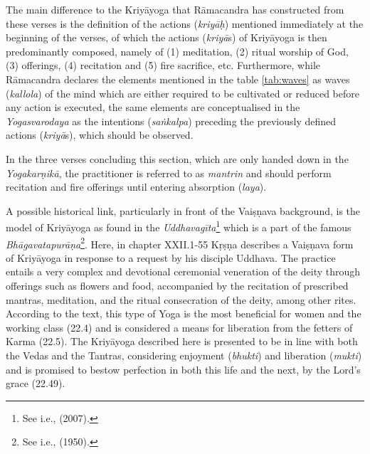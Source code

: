 The main difference to the Kriyāyoga that Rāmacandra has constructed from these verses is the definition of the actions (\textit{kriyāḥ}) mentioned immediately at the beginning of the verses, of which the actions (\textit{kriyā}s) of Kriyāyoga is then predominantly composed, namely of (1) meditation, (2) ritual worship of God, (3) offerings, (4) recitation and (5) fire sacrifice, etc. Furthermore, while Rāmacandra declares the elements mentioned in the table \ref{tab:waves} as waves (\textit{kallola}) of the mind which are either required to be cultivated or reduced before any action is executed, the same elements are conceptualised in the \textit{Yogasvarodaya} as the intentions (\textit{saṅkalpa}) preceding the previously defined actions (\textit{kriyā}s), which should be observed.

In the three verses concluding this section, which are only handed down in the \textit{Yogakarṇikā}, the practitioner is referred to as \textit{mantrin} and should perform recitation and fire offerings until entering absorption (\textit{laya}).

A possible historical link, particularly in front of the Vaiṣṇava background, is the model of Kriyāyoga as found in the \textit{Uddhavagīta}\footnote{See i.e., \citeauthor{uddhavagita2007} (2007).} which is a part of the famous \textit{Bhāgavatapurāṇa}\footnote{See i.e., \citeauthor{bhagavata} (1950).}. Here, in chapter XXII.1-55 Kṛṣṇa describes a Vaiṣṇava form of Kriyāyoga in response to a request by his disciple Uddhava. The practice entails a very complex and devotional ceremonial veneration of the deity through offerings such as flowers and food, accompanied by the recitation of prescribed mantras, meditation, and the ritual consecration of the deity, among other rites. According to the text, this type of Yoga is the most beneficial for women and the working class (22.4) and is considered a means for liberation from the fetters of Karma (22.5). The Kriyāyoga described here is presented to be in line with both the Vedas and the Tantras, considering enjoyment (\textit{bhukti}) and liberation (\textit{mukti}) and is promised to bestow perfection in both this life and the next, by the Lord's grace (22.49).  


